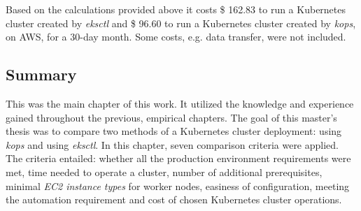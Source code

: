 Based on the calculations provided above it costs \$ 162.83 to run a Kubernetes cluster created by \textit{eksctl} and \$ 96.60 to run a Kubernetes cluster created by \textit{kops}, on AWS, for a 30-day month. Some costs, e.g. data transfer, were not included.




\subsection{Summary}

This was the main chapter of this work. It utilized the knowledge and experience gained throughout the previous, empirical chapters. The goal of this master's thesis was to compare two methods of a Kubernetes cluster deployment: using \textit{kops} and using \textit{eksctl}. In this chapter,  seven comparison criteria were applied. The criteria entailed: whether all the production environment requirements were met, time needed to operate a cluster, number of additional prerequisites, minimal \textit{EC2 instance types} for worker nodes, easiness of configuration, meeting the automation requirement and cost of chosen Kubernetes cluster operations.


